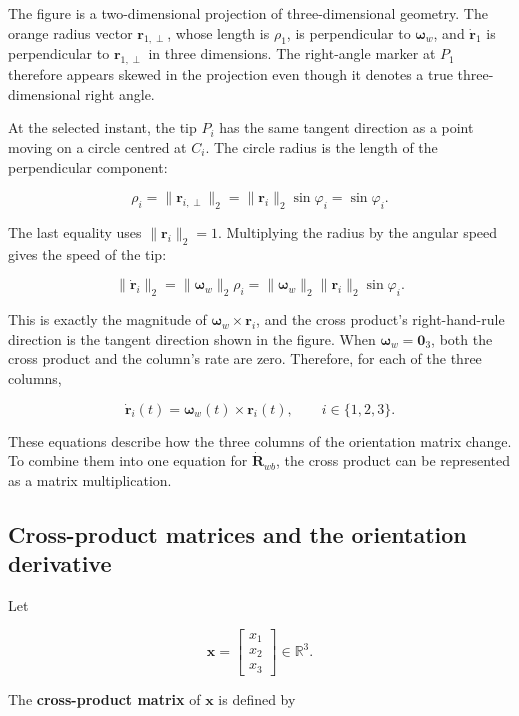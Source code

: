 \documentclass[
  australian,
  12pt,
  letterpaper,
  DIV=11,
  numbers=noendperiod,
  twoside]{scrreprt}
\begin{document}
The figure is a two-dimensional projection of three-dimensional
geometry. The orange radius vector \(\mathbf r_{1,\perp}\), whose length
is \(\rho_1\), is perpendicular to \(\boldsymbol\omega_w\), and
\(\dot{\mathbf r}_1\) is perpendicular to \(\mathbf r_{1,\perp}\) in
three dimensions. The right-angle marker at \(P_1\) therefore appears
skewed in the projection even though it denotes a true three-dimensional
right angle.

At the selected instant, the tip \(P_i\) has the same tangent direction
as a point moving on a circle centred at \(C_i\). The circle radius is
the length of the perpendicular component:

\[
\boxed{
\rho_i
=
\|\mathbf r_{i,\perp}\|_2
=
\|\mathbf r_i\|_2\sin\varphi_i
=
\sin\varphi_i
}.
\]

The last equality uses \(\|\mathbf r_i\|_2=1\). Multiplying the radius
by the angular speed gives the speed of the tip:

\[
\|\dot{\mathbf r}_i\|_2
=
\|\boldsymbol\omega_w\|_2\rho_i
=
\|\boldsymbol\omega_w\|_2
\|\mathbf r_i\|_2
\sin\varphi_i.
\]

This is exactly the magnitude of
\(\boldsymbol\omega_w\times\mathbf r_i\), and the cross product's
right-hand-rule direction is the tangent direction shown in the figure.
When \(\boldsymbol\omega_w=\mathbf 0_3\), both the cross product and the
column's rate are zero. Therefore, for each of the three columns,

\[
\boxed{
\dot{\mathbf r}_i(t)
=
\boldsymbol\omega_w(t)\times\mathbf r_i(t),
\qquad
i\in\{1,2,3\}
}.
\]

These equations describe how the three columns of the orientation matrix
change. To combine them into one equation for \(\dot{\mathbf R}_{wb}\),
the cross product can be represented as a matrix multiplication.

\subsection{Cross-product matrices and the orientation
derivative}\label{sec-so3-cross-product-matrix}

Let

\[
\mathbf x
=
\begin{bmatrix}
x_1\\x_2\\x_3
\end{bmatrix}
\in\mathbb R^3.
\]

The \textbf{cross-product matrix} of \(\mathbf x\) is defined by
\end{document}
